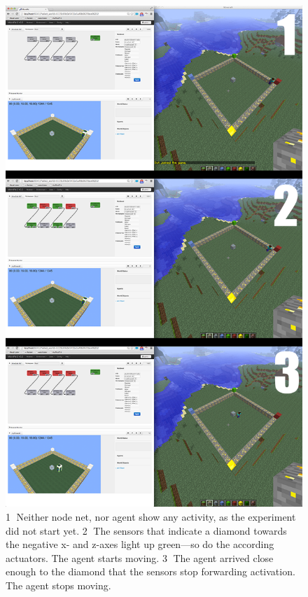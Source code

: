 \begin{figure}[h]
  \centering
    \includegraphics[width=14cm]{graphics/diamond_screens}
  \caption[Screenshots of the experiment]{\textcircled{1} Neither node net, nor agent show any activity, as the experiment did not start yet.  \textcircled{2} The sensors that indicate a diamond towards the negative x- and z-axes light up green---so do the according actuators. The agent starts moving.  \textcircled{3} The agent arrived close enough to the diamond that the sensors stop forwarding activation. The agent stops moving.}
  \label{diamond_screens}
\end{figure}

